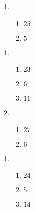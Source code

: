 \documentclass[12pt,twoside]{article}
\makeatletter
\def\emptycleardoublepage{\clearpage\if@twoside \ifodd\c@page\else
\thispagestyle{empty}%
\hbox{}\newpage\if@twocolumn\hbox{}\newpage\fi\fi\fi}
\makeatother
\begin{document}
\begin{multicols}{2}
\begin{enumerate}
\item \begin{enumerate}
\def \a{9}\def \b{16}\def \apb{25}
\item $\apb$
\def \a{10}\def \dif{5}\def \b{5}
\item $\dif$
\def \vshift{5}\def \hshift{-2}\def \chang{1}\def \findval{-1}\def \yval{3}
\end{enumerate}
\end{enumerate}\end{multicols}\emptycleardoublepage{}\graphicspath{{C:/Users/iainc/anaconda3/Randomizer/Sample Course/Sample Assessment 2/}}\begin{multicols}{2} \begin{enumerate}
\item \begin{enumerate}
\def \a{7}\def \b{16}\def \apb{23}
\item $\apb$
\def \a{14}\def \dif{6}\def \b{8}
\item $\dif$
\def \a{4}\def \b{7}\def \ab{11}
\item $\ab$
\def \vshift{5}\def \hshift{4}\def \chang{-1}\def \findval{3}\def \yval{7}
\end{enumerate}

\item \begin{enumerate}
\def \a{9}\def \b{18}\def \apb{27}
\item $\apb$
\def \a{14}\def \dif{6}\def \b{8}
\item $\dif$
\def \vshift{-1}\def \hshift{-2}\def \chang{0}\def \findval{-2}\def \yval{-1}
\end{enumerate}
\end{enumerate}\end{multicols}\emptycleardoublepage{}\graphicspath{{C:/Users/iainc/anaconda3/Randomizer/Sample Course/Sample Assessment 2/}}\begin{multicols}{2} \begin{enumerate}
\item \begin{enumerate}
\def \a{6}\def \b{18}\def \apb{24}
\item $\apb$
\def \a{14}\def \dif{5}\def \b{9}
\item $\dif$
\def \a{5}\def \b{9}\def \ab{14}
\item $\ab$
\def \vshift{5}\def \hshift{4}\def \chang{0}\def \findval{4}\def \yval{5}
\end{enumerate}


\end{enumerate}
\end{multicols}
\end{document}
